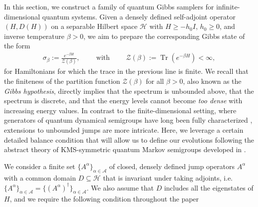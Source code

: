 \documentclass[11pt]{amsart}
\newcommand{\1}{\mathbbm{1}}
\newcommand{\Tr}{\operatorname{Tr}}
\newtheorem{conditionA}{Condition}
\newcommand{\cH}{\mathcal{H}}
\theoremstyle{plain}
\theoremstyle{definition}
\theoremstyle{remark}
\numberwithin{equation}{section}
\begin{document}
\noindent In this section, we construct a family of quantum Gibbs samplers for infinite-dimensional quantum systems. Given a densely defined self-adjoint operator $(H,D(H))$ on a separable Hilbert space $\mathcal{H}$ with $H\ge -h_0 I$, $h_0\ge 0$, and inverse temperature $\beta>0$, we aim to prepare the corresponding Gibbs state of the form
\begin{align*}
\sigma_\beta:=\frac{e^{-\beta H}}{\mathcal{Z}(\beta)},\qquad \text{ with }\qquad \mathcal{Z}(\beta):=\Tr(e^{-\beta H})<\infty,
\end{align*}
for Hamiltonians for which the trace in the previous line is finite.
We recall that the finiteness of the partition function $\mathcal{Z(\beta)}$ for all $\beta>0$, also known as the \textit{Gibbs hypothesis}, directly implies that the spectrum is unbounded above, that the spectrum is discrete, and that the energy levels cannot become \emph{too dense} with increasing energy values. In contrast to the finite-dimensional setting, where generators of quantum dynamical semigroups have long been fully characterized \cite{Lindblad1976,Gorini1976}, extensions to unbounded jumps are more intricate. Here, we leverage a certain detailed balance condition that will allow us to define our evolutions following the abstract theory of KMS-symmetric quantum Markov semigroups developed in \cite{Albeverio1977,Davies1992,Goldstein1995,Cipriani1997}.

We consider a finite set $\{A^\alpha\}_{\alpha\in\mathcal{A}}$ of closed, densely defined jump operators $A^\alpha$ with a common domain $D\subseteq \cH$ that is invariant under taking adjoints, i.e. $\{A^\alpha\}_{\alpha\in \mathcal{A}}=\{(A^\alpha)^\dagger\}_{\alpha\in \mathcal{A}}$. We also assume that $D$ includes all the eigenstates of $H$, and we require the following condition throughout the paper
\end{document}

